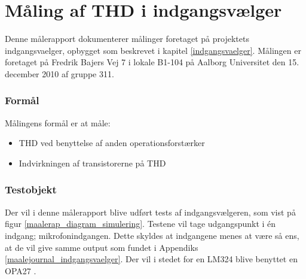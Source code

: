 \chapter{Måling af THD i indgangsvælger}
\label{maalejournal_indgangsvaelger_2}

Denne målerapport dokumenterer målinger foretaget på projektets indgangsvaelger, opbygget som beskrevet i kapitel \ref{indgangsvaelger}. Målingen er foretaget på Fredrik Bajers Vej 7 i lokale B1-104 på Aalborg Universitet den 15. december 2010 af gruppe 311.

\subsection*{Formål}
Målingens formål er at måle:
\begin{itemize}
\item THD ved benyttelse af anden operationsforstærker
\item Indvirkningen af transistorerne på THD
\end{itemize}

\subsection*{Testobjekt}
Der vil i denne målerapport blive udført tests af indgangsvælgeren, som vist på figur \ref{maalerap_diagram_simulering}. Testene vil tage udgangspunkt i én indgang; mikrofonindgangen. Dette skyldes at indgangene menes at være så ens, at de vil give samme output som fundet i Appendiks \ref{maalejournal_indgangsvaelger}. Der vil i stedet for en LM324 blive benyttet en OPA27 \cite{opa27-datablad}.%

